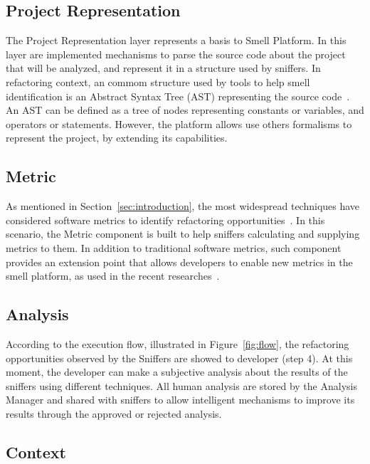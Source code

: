 \documentclass[conference]{IEEEtran}
\begin{document}
\subsection{Project Representation}

The Project Representation layer represents a basis to Smell Platform. In this layer are implemented mechanisms to parse the source code about the project that will be analyzed, and represent it in a structure used by sniffers. In refactoring context, an commom structure used by tools to help smell identification is an Abstract Syntax Tree (AST) representing the source code~\cite{Koschke2006,Mens02formalisingbehaviour,Baxter:1998}. An AST can be defined as a tree of nodes representing constants or variables, and operators or statements. However, the platform allows use others formalisms to represent the project, by extending its capabilities.

\subsection{Metric}

As mentioned in Section~\ref{sec:introduction}, the most widespread techniques have considered 
software metrics to identify refactoring opportunities~\cite{marinescu2004detection,salehie2006metric}. In this scenario, the Metric component is built to help sniffers calculating and supplying metrics to them. In addition to traditional software metrics, such component provides an extension point that allows developers to enable new metrics in the smell platform, as used in the recent researches~\cite{Padilha:2013,Palomba2013d}.

\subsection{Analysis}

According to the execution flow, illustrated in Figure~\ref{fig:flow}, the refactoring opportunities observed by the Sniffers are showed to developer (step 4). At this moment, the developer can make a subjective analysis about the results of the sniffers using different techniques. All human analysis are stored by the Analysis Manager and shared with sniffers to allow intelligent mechanisms to improve its results through the approved or rejected analysis. 

\subsection{Context}
\end{document}
